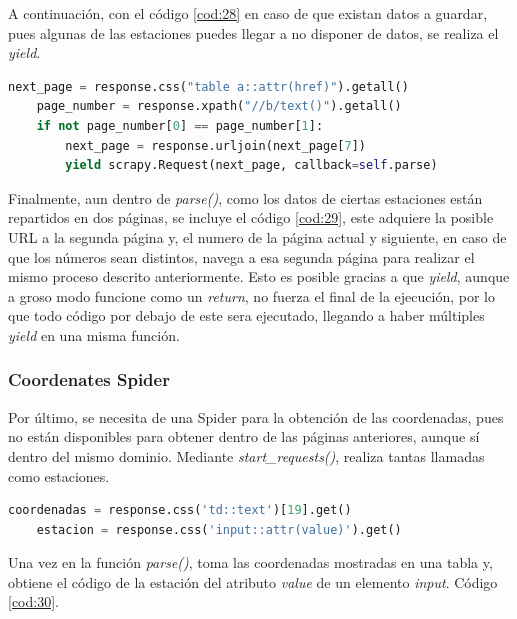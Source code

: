 A continuación, con el código \ref{cod:28} en caso de que existan datos a guardar, pues algunas de las estaciones puedes llegar a no disponer de datos, se realiza el \textit{yield}.

\begin{lstlisting}[language=Python, caption={Navegacion a segunda página de datos en MeteoNavarra Data Spider}, label=cod:29]
	next_page = response.css("table a::attr(href)").getall()
	page_number = response.xpath("//b/text()").getall()
	if not page_number[0] == page_number[1]:
		next_page = response.urljoin(next_page[7])
		yield scrapy.Request(next_page, callback=self.parse)
\end{lstlisting}

Finalmente, aun dentro de \textit{parse()}, como los datos de ciertas estaciones están repartidos en dos páginas, se incluye el código \ref{cod:29}, este adquiere la posible URL a la segunda página y, el numero de la página actual y siguiente, en caso de que los números sean distintos, navega a esa segunda página para realizar el mismo proceso descrito anteriormente.\newline
\newline
Esto es posible gracias a que \textit{yield}, aunque a groso modo funcione como un \textit{return}, no fuerza el final de la ejecución, por lo que todo código por debajo de este sera ejecutado, llegando a haber múltiples \textit{yield} en una misma función.

\subsubsection{Coordenates Spider}
Por último, se necesita de una Spider para la obtención de las coordenadas, pues no están disponibles para obtener dentro de las páginas anteriores, aunque sí dentro del mismo dominio.\newline
\newline
Mediante \textit{start\_requests()}, realiza tantas llamadas como estaciones.

\begin{lstlisting}[language=Python, caption={Selector en \textit{parse()} de MeteoNavarra Coordenates Spider}, label=cod:30]
	coordenadas = response.css('td::text')[19].get()
	estacion = response.css('input::attr(value)').get()
\end{lstlisting}

Una vez en la función \textit{parse()}, toma las coordenadas mostradas en una tabla y, obtiene el código de la estación del atributo \textit{value} de un elemento \textit{input}. Código \ref{cod:30}.

